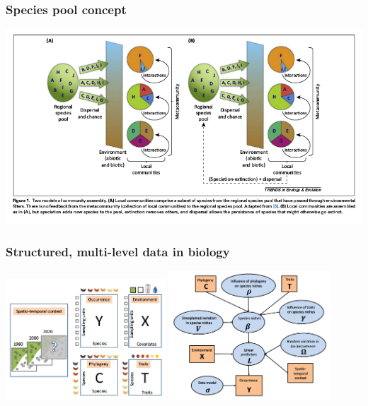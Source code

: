 \documentclass[aspectratio=169]{beamer}
\begin{document}
\begin{frame}
  \frametitle{Species pool concept}

  \begin{center}
    \includegraphics[height=0.775\textheight,width=\textwidth,keepaspectratio=true]{figure/schemske_pool}
  \end{center}

  \tiny{}
\end{frame}

\begin{frame}
  \frametitle{Structured, multi-level data in biology}
  \begin{center}
    \includegraphics[width = 0.45\textwidth,height = 0.775\textheight,keepaspectratio = true]{figure/ovaskainen_data_sm}
    \hspace*{0.1\textwidth}
    \includegraphics[width = 0.45\textwidth,height = 0.775\textheight,keepaspectratio = true]{figure/ovaskainen_dag_sm}
  \end{center}

  \tiny{}
\end{frame}
\end{document}
